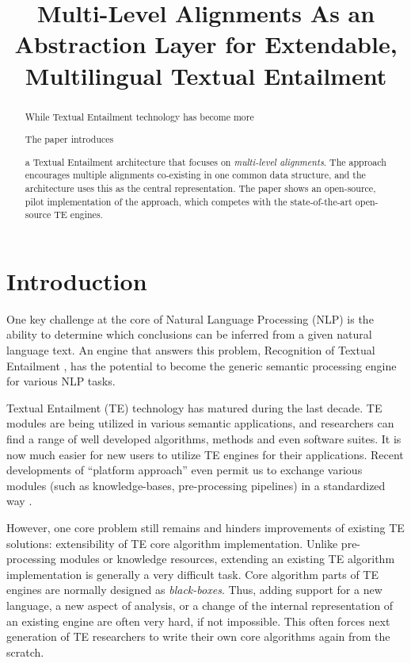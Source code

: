\documentclass[11pt,letterpaper]{article}
\title{Multi-Level Alignments As an Abstraction Layer for Extendable,
  Multilingual Textual Entailment}
\date{}
\begin{document}
\maketitle
\begin{abstract}
While Textual Entailment technology has become more 

The paper introduces 

a Textual Entailment architecture that focuses
on {\em multi-level alignments}. The approach encourages multiple
alignments co-existing in one common data structure, and the
architecture uses this as the central representation. The paper shows
an open-source, pilot implementation of the approach, which competes
with the state-of-the-art open-source TE engines.  
\end{abstract}

\section{Introduction}
One key challenge at the core of Natural Language Processing (NLP) is
the ability to determine which conclusions can be inferred from a
given natural language text. An engine that answers this problem,
Recognition of Textual Entailment \cite{}, has the potential to
become the generic semantic processing engine for various NLP tasks.     

Textual Entailment (TE) technology has matured during the last
decade. TE modules are being utilized in various semantic
applications, and researchers can find a range of well developed
algorithms, methods and even software suites. It is now much easier
for new users to utilize TE engines for their applications. Recent 
developments of ``platform approach'' even permit us to exchange
various modules (such as knowledge-bases, pre-processing pipelines) in
a standardized way \cite{EOP-arch}. 

However, one core problem still remains and hinders improvements of  
existing TE solutions: extensibility of TE core algorithm
implementation. Unlike pre-processing modules or knowledge resources,   
extending an existing TE algorithm implementation is generally a very
difficult task. Core algorithm parts of TE engines are normally
designed as {\em black-boxes}. Thus, adding support for a new
language, a new aspect of analysis, or a change of the internal
representation of an existing engine are often very hard, if not
impossible. This often forces next generation of TE researchers to
write their own core algorithms again from the scratch.
\end{document}
